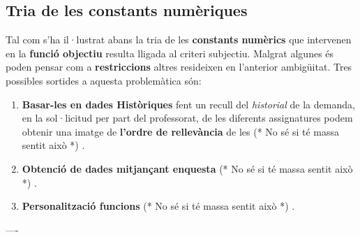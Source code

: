 \documentclass[10pt]{proc}
\newcommand{\nehh}[1]{\color{magenta} (* {#1} *) \normalcolor }
\begin{document}
\subsection{Tria de les constants numèriques}
Tal com s'ha il·lustrat abans la tria de les \textbf{constants numèrics} que intervenen en la \textbf{funció objectiu} resulta lligada al criteri subjectiu. Malgrat algunes és poden pensar com a \textbf{restriccions} altres resideixen en l'anterior ambigüitat. Tres possibles sortides a aquesta problemàtica són:
\begin{enumerate}
	\item \textbf{Basar-les en dades Històriques} fent un recull del \textit{historial}  de la demanda, en la sol·licitud per part del professorat, de les diferents assignatures  podem obtenir una imatge de \textbf{l'ordre de rellevància} de les \nehh{No sé si té massa sentit això}.
	\item \textbf{Obtenció de dades mitjançant enquesta} \nehh{No sé si té massa sentit això}.
	\item \textbf{Personalització funcions} \nehh{No sé si té massa sentit això}.
\end{enumerate} 
----
\\
\newpage
\end{document}
